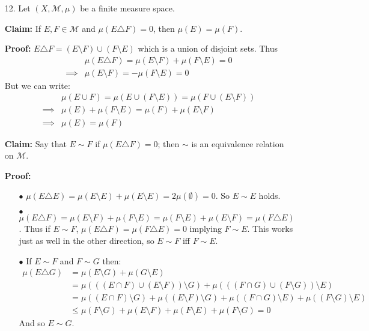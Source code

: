 \documentclass[11pt,letter]{article}
\begin{document}
\begin{enumerate}
    \item[12.] Let $(X,\mathcal{M},\mu)$ be a finite measure space.

    \textbf{Claim:} If $E,F \in \mathcal{M}$ and $\mu(E \triangle F) = 0$, then $\mu(E) = \mu(F)$.

    \textbf{Proof:} $E \triangle F = (E \setminus F) \cup (F \setminus E)$ which is a union of disjoint sets. Thus 
    \begin{align*}
        & \mu(E \triangle F) = \mu(E \setminus F) + \mu(F \setminus E) = 0 \\
        \implies & \mu(E \setminus F) = -\mu(F \setminus E) = 0
    \end{align*}
    But we can write:
    \begin{align*}
        & \mu(E \cup F) = \mu(E \cup (F \setminus E)) = \mu(F \cup (E \setminus F)) \\
        \implies & \mu(E) + \mu(F \setminus E) = \mu(F) + \mu (E \setminus F) \\
        \implies & \mu(E) = \mu(F)
    \end{align*}

    \textbf{Claim:} Say that $E \sim F$ if $\mu(E \triangle F) = 0$; then $\sim$ is an equivalence relation on $\mathcal{M}$.

    \textbf{Proof:} 
        \begin{enumerate}
        \item[$\bullet$] $\mu (E \triangle E) =  \mu(E \setminus E) + \mu(E \setminus E) = 2 \mu(\emptyset) = 0$. So $E \sim E$ holds.
        \item[$\bullet$] $\mu (E \triangle F) = \mu(E \setminus F) + \mu(F \setminus E) = \mu(F \setminus E) + \mu(E \setminus F) = \mu(F \triangle E)$. Thus if $E \sim F$, $\mu(E \triangle F) = \mu(F \triangle E) = 0$ implying $F \sim E$. This works just as well in the other direction, so $E \sim F$ iff $F \sim E$.
        \item[$\bullet$] If $E \sim F$ and $F \sim G$ then:
        \begin{align*}
            \mu(E \triangle G) & = \mu(E \setminus G) + \mu(G \setminus E) \\
            & = \mu(((E \cap F) \cup (E \setminus F)) \setminus G) + \mu(((F \cap G) \cup (F \setminus G)) \setminus E) \\
            & = \mu((E \cap F) \setminus G) + \mu((E \setminus F) \setminus G) + \mu((F \cap G) \setminus E) + \mu((F \setminus G) \setminus E) \\
            & \le \mu(F \setminus G) + \mu(E \setminus F) + \mu(F \setminus E) + \mu(F \setminus G) = 0
        \end{align*} 
        And so $E \sim G$.
        \end{enumerate}


\end{enumerate}
\end{document}
